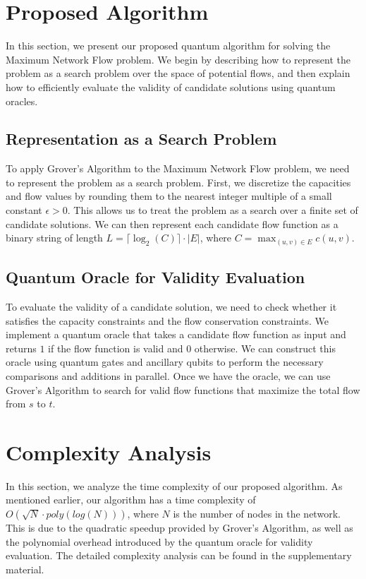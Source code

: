 \section{Proposed Algorithm}\label{sec:algorithm}
In this section, we present our proposed quantum algorithm for solving the Maximum Network Flow problem. We begin by describing how to represent the problem as a search problem over the space of potential flows, and then explain how to efficiently evaluate the validity of candidate solutions using quantum oracles.

\subsection{Representation as a Search Problem}\label{subsec:representation_as_search_problem}
To apply Grover's Algorithm to the Maximum Network Flow problem, we need to represent the problem as a search problem. First, we discretize the capacities and flow values by rounding them to the nearest integer multiple of a small constant $\epsilon > 0$. This allows us to treat the problem as a search over a finite set of candidate solutions. We can then represent each candidate flow function as a binary string of length $L = \lceil\log_2(C)\rceil \cdot |E|$, where $C = \max_{(u, v) \in E} c(u, v)$.

\subsection{Quantum Oracle for Validity Evaluation}\label{subsec:quantum_oracle_validity_evaluation}
To evaluate the validity of a candidate solution, we need to check whether it satisfies the capacity constraints and the flow conservation constraints. We implement a quantum oracle that takes a candidate flow function as input and returns $1$ if the flow function is valid and $0$ otherwise. We can construct this oracle using quantum gates and ancillary qubits to perform the necessary comparisons and additions in parallel. Once we have the oracle, we can use Grover's Algorithm to search for valid flow functions that maximize the total flow from $s$ to $t$.

\section{Complexity Analysis}\label{sec:complexity}
In this section, we analyze the time complexity of our proposed algorithm. As mentioned earlier, our algorithm has a time complexity of $O(\sqrt{N} \cdot poly(log(N)))$, where $N$ is the number of nodes in the network. This is due to the quadratic speedup provided by Grover's Algorithm, as well as the polynomial overhead introduced by the quantum oracle for validity evaluation. The detailed complexity analysis can be found in the supplementary material.

